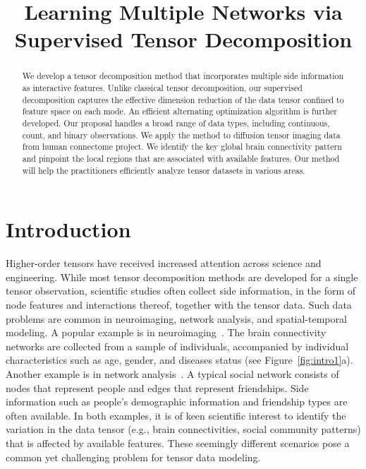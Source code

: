 \documentclass{article}
\title{Learning Multiple Networks via Supervised Tensor Decomposition}
\theoremstyle{definition}
\theoremstyle{definition}
\begin{document}
\maketitle

\begin{abstract}
   We develop a tensor decomposition method that incorporates multiple side information as interactive features. Unlike classical tensor decomposition, our supervised decomposition captures the effective dimension reduction of the data tensor confined to feature space on each mode. An efficient alternating optimization algorithm is further developed. Our proposal handles a broad range of data types, including continuous, count, and binary observations. We apply the method to diffusion tensor imaging data from human connectome project. We identify the key global brain connectivity pattern and pinpoint the local regions that are associated with available features. Our method will help the practitioners efficiently analyze tensor datasets in various areas.
\end{abstract}

\section{Introduction}
 Higher-order tensors have received increased attention across science and engineering. While most tensor decomposition methods are developed for a single tensor observation, scientific studies often collect side information, in the form of node features and interactions thereof, together with the tensor data. Such data problems are common in neuroimaging, network analysis, and spatial-temporal modeling. A popular example is in neuroimaging~\citep{zhou2013tensor}. The brain connectivity networks are collected from a sample of individuals, accompanied by individual characteristics such as age, gender, and diseases status (see Figure~\ref{fig:intro1}a). Another example is in network analysis~\citep{pmlr-v108-berthet20a,hoff2005bilinear}. A typical social network consists of nodes that represent people and edges that represent  friendships. Side information such as people’s demographic information and friendship types are often available. In both examples, it is of keen scientific interest to identify the variation in the data tensor (e.g., brain connectivities, social community patterns) that is affected by available features. These seemingly different scenarios pose a common yet challenging problem for tensor data modeling. 
 
\end{document}
